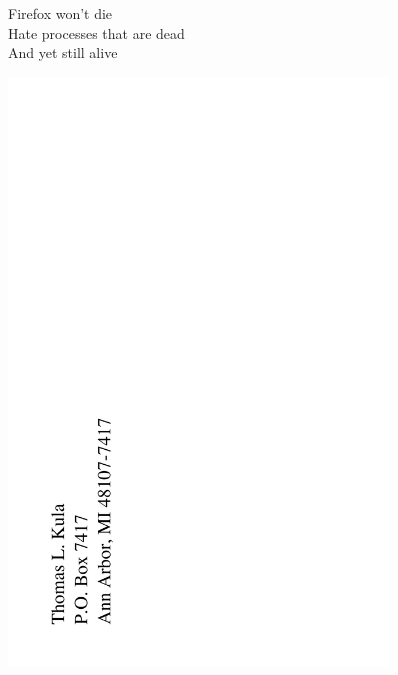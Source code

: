 \documentclass[12pt]{article}
\begin{document}
Firefox won't die \\
Hate processes that are dead \\
And yet still alive

      
\newpage

\includegraphics[width=101mm]{backpage.png}
\end{document}
